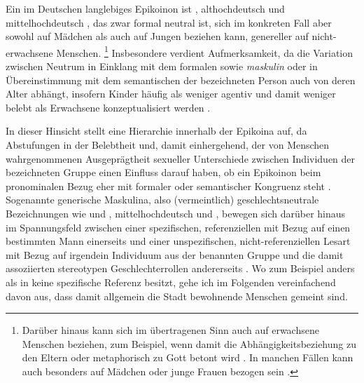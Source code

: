 Ein im Deutschen langlebiges Epikoinon ist ,
althochdeutsch  und
mittelhochdeutsch , das zwar formal neutral
ist, sich im konkreten Fall aber sowohl auf Mädchen als auch auf Jungen
beziehen kann, genereller auf nicht-erwachsene Menschen.%
%
	\footnote{Darüber hinaus kann sich  im übertragenen Sinn auch auf
		erwachsene Menschen beziehen, zum Beispiel, wenn damit die
		Abhängigkeitsbeziehung zu den Eltern oder metaphorisch zu Gott betont
		wird \autocite[s.\,v.~\textit{kint}]{lexer:mhdhwb}. In manchen Fällen
		kann  auch besonders auf Mädchen oder junge Frauen bezogen
		sein \autocites[808--816]{drw7}[s.\,v.~\textit{Kind}]{duden-online}.}
%
Insbesondere  verdient Aufmerksamkeit, da die Variation zwischen
Neutrum in Einklang mit dem formalen  sowie \emph{maskulin}
oder  in Übereinstimmung mit dem semantischen
 der bezeichneten Person auch von
deren Alter abhängt, insofern Kinder häufig als weniger agentiv und damit
weniger belebt als Erwachsene konzeptualisiert werden
\autocites[196]{comrie1989}[258--259]{birkenesfleischer2022}[151]{klein2022}.

In dieser Hinsicht stellt \citet[172--174]{klein2022} eine Hierarchie innerhalb
der Epikoina auf, da Abstufungen in der Belebtheit und, damit einhergehend, der
von Menschen wahrgenommenen Ausgeprägtheit sexueller Unterschiede zwischen
Individuen der bezeichneten Gruppe einen Einfluss darauf haben, ob ein
Epikoinon beim pronominalen Bezug eher mit formaler oder
semantischer Kongruenz steht
\autocite[vgl.~auch][74--83]{kotthoffnuebling2018}. Sogenannte generische
Maskulina, also (vermeintlich)
geschlechtsneutrale Bezeichnungen wie  und
, mittelhochdeutsch  und
, bewegen sich darüber hinaus im Spannungsfeld zwischen einer
spezifischen, referenziellen  mit Bezug auf einen
bestimmten Mann einerseits und einer unspezifischen,
nicht-referenziellen Lesart mit Bezug auf irgendein Individuum aus der
benannten Gruppe und die damit assoziierten stereotypen
Geschlechterrollen andererseits
\autocites[91--122]{kotthoffnuebling2018}[159--160, 179--180]{klein2022}. Wo
zum Beispiel  anders als in  keine
spezifische Referenz besitzt, gehe ich im Folgenden vereinfachend davon aus,
dass damit allgemein die Stadt bewohnende Menschen gemeint sind.

